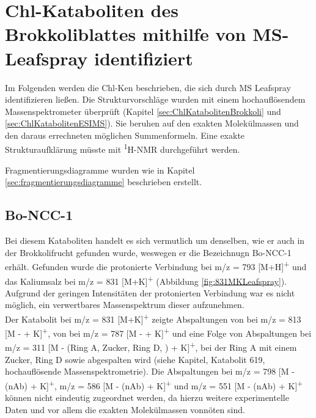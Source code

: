 \section{Chl-Kataboliten des Brokkoliblattes mithilfe von MS-Leafspray identifiziert}

Im Folgenden werden die \gls{Chl-K}en beschrieben, die sich durch MS Leafspray identifizieren ließen. Die Strukturvorschläge wurden mit einem hochauflösendem Massenspektrometer überprüft (Kapitel \ref{sec:ChlKatabolitenBrokkoli} und \ref{sec:ChlKatabolitenESIMS}). Sie beruhen auf den exakten Molekülmassen und den daraus errechneten möglichen Summenformeln. Eine exakte Strukturaufklärung müsste mit \textsuperscript{1}H-NMR durchgeführt werden. 

Fragmentierungsdiagramme wurden wie in Kapitel \ref{sec:fragmentierungsdiagramme} beschrieben erstellt.

\subsection{Bo-NCC-1} \label{sec:MSLeafsprayBoNCC1}

Bei diesem Kataboliten handelt es sich vermutlich um denselben, wie er auch in der Brokkolifrucht gefunden wurde, weswegen er die Bezeichnugn Bo-NCC-1 erhält. \cite{ChlorophyllCatabolitesBroccoli} Gefunden wurde die protonierte Verbindung bei m/z = 793 [M+H]\textsuperscript{+} und das Kaliumsalz bei m/z = 831 [M+K]\textsuperscript{+} (Abbildung \ref{fig:831MKLeafspray}). Aufgrund der geringen Intensitäten der protonierten Verbindung war es nicht möglich, ein verwertbares Massenspektrum dieser aufzunehmen. \\

Der Katabolit bei m/z = 831 [M+K]\textsuperscript{+} zeigte Abspaltungen von  bei m/z = 813 [M -  + K]\textsuperscript{+}, von  bei m/z = 787 [M -  + K]\textsuperscript{+} und eine Folge von Abspaltungen bei m/z = 311 [M - (Ring A, Zucker, Ring D, ) + K]\textsuperscript{+}, bei der Ring A mit einem Zucker, Ring D sowie  abgespalten wird (siehe Kapitel, Katabolit 619, hochauflösende Massenspektrometrie). Die Abspaltungen bei m/z = 798 [M - (\gls{nAb}) + K]\textsuperscript{+}, m/z = 586 [M - (\gls{nAb}) + K]\textsuperscript{+} und m/z = 551 [M - (\gls{nAb}) + K]\textsuperscript{+} können nicht eindeutig zugeordnet werden, da hierzu weitere experimentelle Daten und vor allem die exakten Molekülmassen vonnöten sind. 

